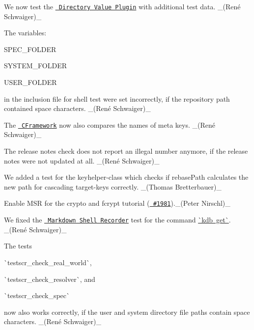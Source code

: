 \begin{DoxyItemize}
\item We now test the \href{https://www.libelektra.org/plugins/directoryvalue}{\texttt{ Directory Value Plugin}} with additional test data. \+\_\+(René Schwaiger)\+\_\+
\item The variables\+:
\begin{DoxyItemize}
\item {\ttfamily S\+P\+E\+C\+\_\+\+F\+O\+L\+D\+ER}
\item {\ttfamily S\+Y\+S\+T\+E\+M\+\_\+\+F\+O\+L\+D\+ER}
\item {\ttfamily U\+S\+E\+R\+\_\+\+F\+O\+L\+D\+ER}
\end{DoxyItemize}

in the inclusion file for shell test were set incorrectly, if the repository path contained space characters. \+\_\+(René Schwaiger)\+\_\+
\item The \href{https://master.libelektra.org/tests/cframework}{\texttt{ C\+Framework}} now also compares the names of meta keys. \+\_\+(René Schwaiger)\+\_\+
\item The release notes check does not report an illegal number anymore, if the release notes were not updated at all. \+\_\+(René Schwaiger)\+\_\+
\item We added a test for the keyhelper-\/class which checks if rebase\+Path calculates the new path for cascading target-\/keys correctly. \+\_\+(\+Thomas Bretterbauer)\+\_\+
\item Enable M\+SR for the crypto and fcrypt tutorial (\href{https://github.com/ElektraInitiative/libelektra/issues/1981}{\texttt{ \#1981}}).\+\_\+(\+Peter Nirschl)\+\_\+
\item We fixed the \href{https://master.libelektra.org/tests/shell/shell_recorder/tutorial_wrapper}{\texttt{ Markdown Shell Recorder}} test for the command \mbox{\hyperlink{doc_help_kdb-get_md}{\`{}kdb get\`{}}}. \+\_\+(René Schwaiger)\+\_\+
\item The tests
\begin{DoxyItemize}
\item \`{}testscr\+\_\+check\+\_\+real\+\_\+world\`{},
\item \`{}testscr\+\_\+check\+\_\+resolver\`{}, and
\item \`{}testscr\+\_\+check\+\_\+spec\`{}
\end{DoxyItemize}

now also works correctly, if the {\ttfamily user} and {\ttfamily system} directory file paths contain space characters. \+\_\+(René Schwaiger)\+\_\+
\end{DoxyItemize}


